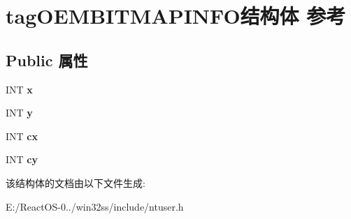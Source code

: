 \hypertarget{structtag_o_e_m_b_i_t_m_a_p_i_n_f_o}{}\section{tag\+O\+E\+M\+B\+I\+T\+M\+A\+P\+I\+N\+F\+O结构体 参考}
\label{structtag_o_e_m_b_i_t_m_a_p_i_n_f_o}
\subsection*{Public 属性}
\begin{DoxyCompactItemize}
\item 
\mbox{\label{structtag_o_e_m_b_i_t_m_a_p_i_n_f_o_a9973155d7edf47729077cd8e5ce5eacf}} 
I\+NT {\bfseries x}
\item 
\mbox{\label{structtag_o_e_m_b_i_t_m_a_p_i_n_f_o_a75e51ba47206e17ea30df50789044747}} 
I\+NT {\bfseries y}
\item 
\mbox{\label{structtag_o_e_m_b_i_t_m_a_p_i_n_f_o_a56b0820f3817438824d6914a4e9b8e22}} 
I\+NT {\bfseries cx}
\item 
\mbox{\label{structtag_o_e_m_b_i_t_m_a_p_i_n_f_o_a8468a7ceddd3587e80abc1072720f1e2}} 
I\+NT {\bfseries cy}
\end{DoxyCompactItemize}


该结构体的文档由以下文件生成\+:\begin{DoxyCompactItemize}
\item 
E\+:/\+React\+O\+S-\/0../win32ss/include/ntuser.\+h\end{DoxyCompactItemize}
